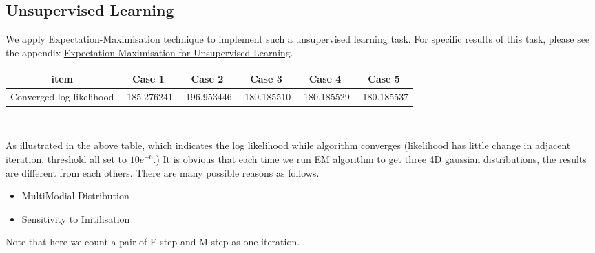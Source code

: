\documentclass[11pt,a4paper]{article}
\newcommand{\htab}{\hspace*{0.63cm}}
\begin{document}
\subsection{Unsupervised Learning}
\htab We apply Expectation-Maximisation technique to implement such a unsupervised learning task. 
For specific results of this task, please see the appendix 
\hyperlink{EM}{Expectation Maximisation for Unsupervised Learning}.
\begin{center}
    \begin{tabular}{||c|c|c|c|c|c||} \hline
item &   Case 1 &  Case 2  & Case 3  & Case 4  &  Case 5  \\ \hline
Converged log likelihood    & -185.276241 &  -196.953446 &  -180.185510 &  -180.185529 &  -180.185537 \\ \hline
    \end{tabular} \\
\end{center}
\htab As illustrated in the above table, which indicates the log likelihood while algorithm 
converges (likelihood has little change in adjacent iteration, threshold all set to $10e^{-6}$.)
It is obvious that each time we run EM algorithm to get three 4D gaussian distributions,
the results are different from each others. There are many possible reasons as follows.
\begin{itemize}
    \item{MultiModial Distribution}
    \item{Sensitivity to Initilisation}
        \end{itemize}
\htab Note that here we count a pair of E-step and M-step as one iteration.
\newpage
\end{document}
